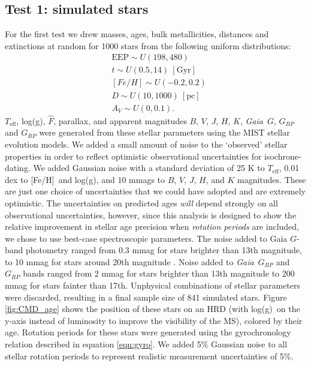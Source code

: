 \documentclass[useAMS, usenatbib, preprint, 12pt]{aastex}
\newcommand{\gaia}{{\it Gaia}}
\newcommand{\teff}{$T_{\mathrm{eff}}$}
\newcommand{\feh}{[Fe/H]}
\newcommand{\logg}{log(g)}
\newcommand{\fhat}{$\hat{F}$}
\begin{document}
\subsection{Test 1: simulated stars}
For the first test we drew masses, ages, bulk metallicities, distances and
extinctions at random for 1000 stars from the following uniform distributions:
\begin{eqnarray}
& \mathrm{EEP} \sim U(198, 480) \\
& t \sim U(0.5, 14)\mathrm{~[Gyr]} \\
& [Fe/H] \sim U(-0.2, 0.2) \\
& D \sim U(10, 1000)~\mathrm{[pc]} \\
& A_V \sim U(0, 0.1).
\end{eqnarray}
\teff, \logg, \fhat, parallax, and apparent magnitudes $B$, $V$, $J$, $H$, $K$,
\gaia\ $G$, $G_{BP}$ and $G_{RP}$ were generated from these
stellar parameters using the MIST stellar evolution models.
We added a small amount of noise to the `observed' stellar properties in order
to reflect optimistic observational uncertainties for isochrone-dating.
We added Gaussian noise with a standard deviation of 25 K to \teff, 0.01 dex
to \feh\ and \logg, and 10 mmags to $B$, $V$, $J$, $H$, and $K$ magnitudes.
These are just one choice of uncertainties that we could have adopted and are
extremely optimistic.
The uncertainties on predicted ages {\it will} depend strongly on all
observational uncertainties, however, since this analysis is designed to show
the relative improvement in stellar age precision when {\it rotation periods}
are included, we chose to use best-case spectroscopic parameters.
The noise added to Gaia $G$-band photometry ranged from
0.3 mmag for stars brighter than 13th magnitude, to 10 mmag for stars
around 20th magnitude \citep{evans2017, brown2018}.
Noise added to \gaia\ $G_{BP}$ and $G_{RP}$ bands ranged from 2 mmag for stars
brighter than 13th magnitude to 200 mmag for stars fainter than 17th.
Unphysical combinations of stellar parameters were discarded, resulting in a
final sample size of 841 simulated stars.
Figure \ref{fig:CMD_age} shows the position of these stars on an HRD
(with \logg\ on the y-axis instead of luminosity to improve the visibility of
the MS), colored by their age.
Rotation periods for these stars were generated using the gyrochronology
relation described in equation \ref{eqn:gyro}.
We added 5\% Gaussian noise to all stellar rotation periods to represent
realistic measurement uncertainties of 5\%.
\end{document}
